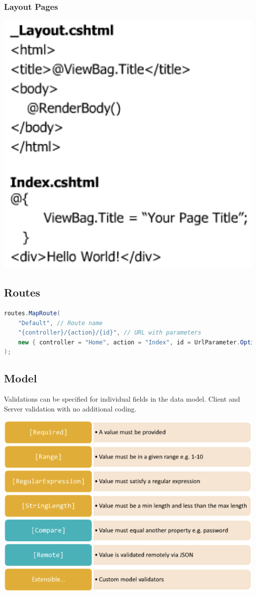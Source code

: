 \documentclass[10pt]{article}
\begin{document}
\subsubsection{Layout Pages}
\begin{center}
	\includegraphics[scale=0.2]{mvc_view_layout.png}
\end{center}
\subsection{Routes}
\begin{lstlisting}[language=Java, caption=routes, style=JavaStyle]
routes.MapRoute(
	"Default", // Route name
	"{controller}/{action}/{id}", // URL with parameters
	new { controller = "Home", action = "Index", id = UrlParameter.Optional } // Default
);
\end{lstlisting}
\subsection{Model}
Validations can be specified for individual fields in the data model. Client and Server validation with no additional coding.	
\begin{center}
	\includegraphics[scale=0.2]{mvc_model.png}
\end{center}

\end{document}
